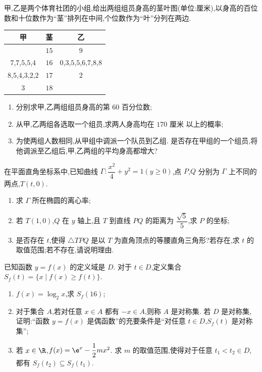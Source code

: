 \begin{problem}
甲,乙是两个体育社团的小组,给出两组组员身高的茎叶图(单位:厘米),以身高的百位数和十位数作为``茎''排列在中间,个位数作为``叶''分列在两边.

\begin{center}
\begin{tabular}{c|c|c}
甲 & 茎 & 乙\\
\hline
 & \(15\) & \(9\)\\
\(7\),\(7\),\(5\),\(5\),\(4\) & \(16\) & \(0\),\(3\),\(5\),\(5\),\(6\),\(7\),\(8\),\(8\)\\
\(8\),\(5\),\(4\),\(3\),\(2\),\(2\) & \(17\) & \(2\)\\
\(3\) & \(18\) &
\end{tabular}
\end{center}

\begin{enumerate}
\item 分别求甲,乙两组组员身高的第 \(60\) 百分位数;
\item 从甲,乙两组各选取一个组员,求两人身高均在 \(170\text{ 厘米}\) 以上的概率;
\item 为使两组人数相同,从甲组中调派一个队员到乙组. 是否存在甲组的一个组员,将他调派至乙组后,甲,乙两组的平均身高都增大?
\end{enumerate}
\end{problem}

\begin{problem}
在平面直角坐标系中,已知曲线 \(\Gamma:\dfrac{x^2}{4}+y^2=1(y\ge0)\),点 \(P\),\(Q\) 分别为 \(\Gamma\) 上不同的两点,\(T(t,0)\).
\begin{enumerate}
\item 求 \(\Gamma\) 所在椭圆的离心率;
\item 若 \(T(1,0)\),\(Q\) 在 \(y\) 轴上,且 \(T\) 到直线 \(PQ\) 的距离为 \(\dfrac{\sqrt5}{5}\),求 \(P\) 的坐标;
\item 是否存在 \(t\),使得 \(\triangle TPQ\) 是以 \(T\) 为直角顶点的等腰直角三角形?若存在,求 \(t\) 的取值范围;若不存在,请说明理由.
\end{enumerate}

\end{problem}

\begin{problem}
已知函数 \(y=f(x)\) 的定义域是 \(D\). 对于 \(t\in D\),定义集合 \(S_f(t)=\{x\mid f(x)\ge f(t)\}\).
\begin{enumerate}
\item \(f(x)=\log_2x\),求 \(S_f(16)\);
\item 对于集合 \(A\),若对任意 \(x\in A\) 都有 \(-x\in A\),则称 \(A\) 是对称集. 若 \(D\) 是对称集,证明:``函数 \(y=f(x)\) 是偶函数''的充要条件是``对任意 \(t\in D\),\(S_f(t)\) 是对称集'';
\item 若 \(x\in\R\),\(f(x)=\e^x-\dfrac12mx^2\). 求 \(m\) 的取值范围,使得对于任意 \(t_1<t_2\in D\),都有 \(S_f(t_2)\subseteq S_f(t_1)\).
\end{enumerate}
\end{problem}

